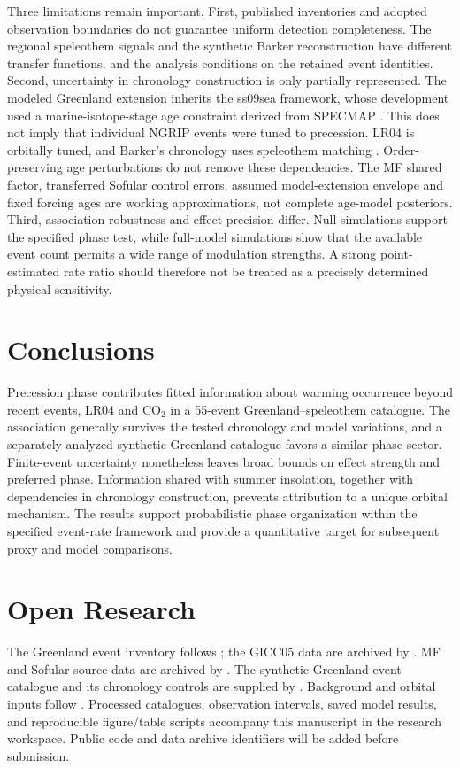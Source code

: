 \documentclass[11pt]{article}
\begin{document}
Three limitations remain important. First, published inventories and adopted observation boundaries do not guarantee uniform detection completeness. The regional speleothem signals and the synthetic Barker reconstruction have different transfer functions, and the analysis conditions on the retained event identities. Second, uncertainty in chronology construction is only partially represented. The modeled Greenland extension inherits the ss09sea framework, whose development used a marine-isotope-stage age constraint derived from SPECMAP \citep{southon2004radiocarbon,wolff2010millennial}. This does not imply that individual NGRIP events were tuned to precession. LR04 is orbitally tuned, and Barker's chronology uses speleothem matching \citep{lisiecki2005pliocene,barker2011800}. Order-preserving age perturbations do not remove these dependencies. The MF shared factor, transferred Sofular control errors, assumed model-extension envelope and fixed forcing ages are working approximations, not complete age-model posteriors. Third, association robustness and effect precision differ. Null simulations support the specified phase test, while full-model simulations show that the available event count permits a wide range of modulation strengths. A strong point-estimated rate ratio should therefore not be treated as a precisely determined physical sensitivity.

\section{Conclusions}
Precession phase contributes fitted information about warming occurrence beyond recent events, LR04 and CO$_2$ in a 55-event Greenland--speleothem catalogue. The association generally survives the tested chronology and model variations, and a separately analyzed synthetic Greenland catalogue favors a similar phase sector. Finite-event uncertainty nonetheless leaves broad bounds on effect strength and preferred phase. Information shared with summer insolation, together with dependencies in chronology construction, prevents attribution to a unique orbital mechanism. The results support probabilistic phase organization within the specified event-rate framework and provide a quantitative target for subsequent proxy and model comparisons.

\section*{Open Research}
The Greenland event inventory follows \citet{rasmussen2014stratigraphic}; the GICC05 data are archived by \citet{rasmussen2022gicc05}. MF and Sofular source data are archived by \citet{fohlmeister2023mfData,held2024sofularData}. The synthetic Greenland event catalogue and its chronology controls are supplied by \citet{barker2011800}. Background and orbital inputs follow \citet{lisiecki2005pliocene,bereiter2015revision,laskar2004long}. Processed catalogues, observation intervals, saved model results, and reproducible figure/table scripts accompany this manuscript in the research workspace. Public code and data archive identifiers will be added before submission.
\end{document}
